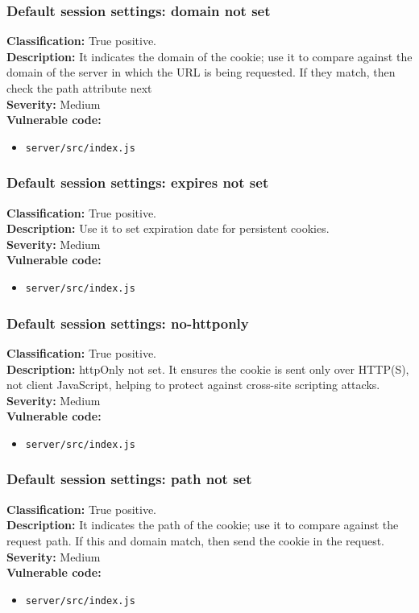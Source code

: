 \documentclass[]{article}
\begin{document}
\subsubsection{Default session settings: domain not set}
\textbf{Classification:} {True positive.} \\
\textbf{Description:} It indicates the domain of the cookie; use it
          to compare against the domain of the server in which the URL is being requested. If they match, then
          check the path attribute next \\ 
\textbf{Severity:}  Medium \\ 
\textbf{Vulnerable code:}
\begin{itemize}
    \item \texttt{server/src/index.js}
\end{itemize}

\subsubsection{Default session settings: expires not set}
\textbf{Classification:} {True positive.} \\
\textbf{Description:} Use it to set expiration date for persistent cookies. \\
\textbf{Severity:}  Medium\\ 
\textbf{Vulnerable code:}
\begin{itemize}
    \item \texttt{server/src/index.js}
\end{itemize}


\subsubsection{Default session settings: no-httponly}
\textbf{Classification:} {True positive.} \\
\textbf{Description:} httpOnly not set. It ensures the cookie is sent only over
          HTTP(S), not client JavaScript, helping to protect against cross-site scripting attacks. \\
\textbf{Severity:}  Medium\\ 
\textbf{Vulnerable code:}
\begin{itemize}
    \item \texttt{server/src/index.js}
\end{itemize}


\subsubsection{Default session settings: path not set}
\textbf{Classification:} {True positive.} \\
\textbf{Description:} It indicates the path of the cookie; use it to compare against the request path. If this and domain match, then send the cookie in the request.\\
\textbf{Severity:}  Medium\\ 
\textbf{Vulnerable code:}
\begin{itemize}
    \item \texttt{server/src/index.js}
\end{itemize}
\end{document}
